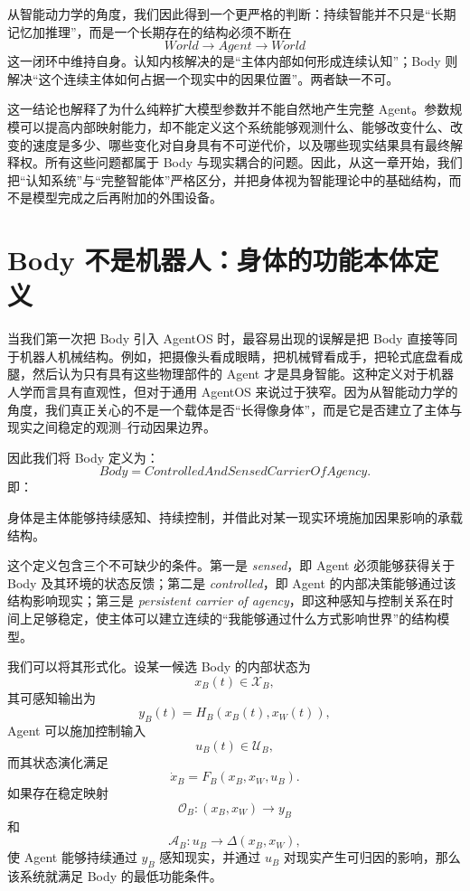 从智能动力学的角度，我们因此得到一个更严格的判断：持续智能并不只是“长期记忆加推理”，而是一个长期存在的结构必须不断在
\[
World
\rightarrow
Agent
\rightarrow
World
\]
这一闭环中维持自身。认知内核解决的是“主体内部如何形成连续认知”；Body 则解决“这个连续主体如何占据一个现实中的因果位置”。两者缺一不可。

这一结论也解释了为什么纯粹扩大模型参数并不能自然地产生完整 Agent。参数规模可以提高内部映射能力，却不能定义这个系统能够观测什么、能够改变什么、改变的速度是多少、哪些变化对自身具有不可逆代价，以及哪些现实结果具有最终解释权。所有这些问题都属于 Body 与现实耦合的问题。因此，从这一章开始，我们把“认知系统”与“完整智能体”严格区分，并把身体视为智能理论中的基础结构，而不是模型完成之后再附加的外围设备。

\section{Body 不是机器人：身体的功能本体定义}

当我们第一次把 Body 引入 AgentOS 时，最容易出现的误解是把 Body 直接等同于机器人机械结构。例如，把摄像头看成眼睛，把机械臂看成手，把轮式底盘看成腿，然后认为只有具有这些物理部件的 Agent 才是具身智能。这种定义对于机器人学而言具有直观性，但对于通用 AgentOS 来说过于狭窄。因为从智能动力学的角度，我们真正关心的不是一个载体是否“长得像身体”，而是它是否建立了主体与现实之间稳定的观测--行动因果边界。

因此我们将 Body 定义为：
\[
\boxed{
Body
=
ControlledAndSensedCarrierOfAgency.
}
\]
即：
\begin{statementbox}
身体是主体能够持续感知、持续控制，并借此对某一现实环境施加因果影响的承载结构。
\end{statementbox}

这个定义包含三个不可缺少的条件。第一是 \emph{sensed}，即 Agent 必须能够获得关于 Body 及其环境的状态反馈；第二是 \emph{controlled}，即 Agent 的内部决策能够通过该结构影响现实；第三是 \emph{persistent carrier of agency}，即这种感知与控制关系在时间上足够稳定，使主体可以建立连续的“我能够通过什么方式影响世界”的结构模型。

我们可以将其形式化。设某一候选 Body 的内部状态为
\[
x_B(t)\in\mathcal X_B,
\]
其可感知输出为
\[
y_B(t)
=
H_B
\left(
x_B(t),
x_W(t)
\right),
\]
Agent 可以施加控制输入
\[
u_B(t)\in\mathcal U_B,
\]
而其状态演化满足
\[
\dot{x}_B
=
F_B
\left(
x_B,
x_W,
u_B
\right).
\]
如果存在稳定映射
\[
\mathcal O_B:
(x_B,x_W)
\rightarrow
y_B
\]
和
\[
\mathcal A_B:
u_B
\rightarrow
\Delta(x_B,x_W),
\]
使 Agent 能够持续通过 $y_B$ 感知现实，并通过 $u_B$ 对现实产生可归因的影响，那么该系统就满足 Body 的最低功能条件。

